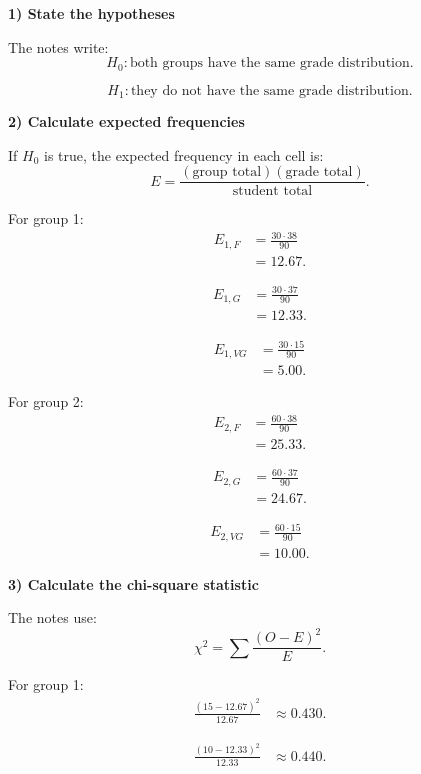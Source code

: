 \documentclass[10pt]{article}
\begin{document}
\textbf{1) State the hypotheses}

The notes write:
\[
H_0:
\text{both groups have the same grade distribution.}
\]

\[
H_1:
\text{they do not have the same grade distribution.}
\]

\textbf{2) Calculate expected frequencies}

If \(H_0\) is true, the expected frequency in each
cell is:
\[
E=
\frac{
(\text{group total})(\text{grade total})
}{
\text{student total}
}.
\]

For group 1:
\begin{align*}
E_{1,F}
&=
\frac{30\cdot 38}{90}
\\[2mm]
&=12.67.
\end{align*}

\begin{align*}
E_{1,G}
&=
\frac{30\cdot 37}{90}
\\[2mm]
&=12.33.
\end{align*}

\begin{align*}
E_{1,VG}
&=
\frac{30\cdot 15}{90}
\\[2mm]
&=5.00.
\end{align*}

For group 2:
\begin{align*}
E_{2,F}
&=
\frac{60\cdot 38}{90}
\\[2mm]
&=25.33.
\end{align*}

\begin{align*}
E_{2,G}
&=
\frac{60\cdot 37}{90}
\\[2mm]
&=24.67.
\end{align*}

\begin{align*}
E_{2,VG}
&=
\frac{60\cdot 15}{90}
\\[2mm]
&=10.00.
\end{align*}

\textbf{3) Calculate the chi-square statistic}

The notes use:
\[
\chi^2
=
\sum
\frac{(O-E)^2}{E}.
\]

For group 1:
\begin{align*}
\frac{(15-12.67)^2}{12.67}
&\approx 0.430.
\end{align*}

\begin{align*}
\frac{(10-12.33)^2}{12.33}
&\approx 0.440.
\end{align*}
\end{document}

